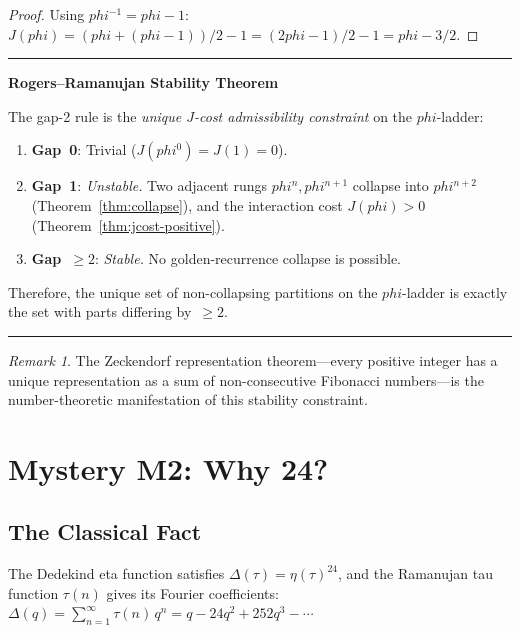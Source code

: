 \documentclass[11pt]{article}
\def\leanverified{}
\def\phig{phi}
\def\Jcost{J}
\theoremstyle{plain}
\theoremstyle{definition}
\theoremstyle{remark}
\newtheorem{remark}[theorem]{Remark}
\newenvironment{keyresult}[1][]
  {\begin{center}\begin{minipage}{0.92\textwidth}\hrule\vspace{0.5em}\textbf{#1}\par\vspace{0.3em}}
  {\vspace{0.5em}\hrule\end{minipage}\end{center}\vspace{0.5em}}
\newcommand{\leanverified}{\textsuperscript{\textnormal{[\textsc{Lean}]}}}
\newcommand{\phig}{\varphi}
\newcommand{\Jcost}{J}
\begin{document}
\begin{proof}
Using $\phig^{-1} = \phig - 1$:
$\Jcost(\phig) = (\phig + (\phig - 1))/2 - 1 = (2\phig - 1)/2 - 1 = \phig - 3/2$.
\end{proof}

\begin{keyresult}[Rogers--Ramanujan Stability Theorem\leanverified]
The gap-2 rule is the \emph{unique $\Jcost$-cost admissibility constraint} on the $\phig$-ladder:
\begin{enumerate}[label=(\roman*)]
\item \textbf{Gap~0}: Trivial ($\Jcost(\phig^0) = \Jcost(1) = 0$).
\item \textbf{Gap~1}: \emph{Unstable.}
      Two adjacent rungs $\phig^n, \phig^{n+1}$ collapse
      into $\phig^{n+2}$ (Theorem~\ref{thm:collapse}),
      and the interaction cost $\Jcost(\phig) > 0$ (Theorem~\ref{thm:jcost-positive}).
\item \textbf{Gap~$\ge 2$}: \emph{Stable.}
      No golden-recurrence collapse is possible.
\end{enumerate}
Therefore, the unique set of non-collapsing partitions on the $\phig$-ladder
is exactly the set with parts differing by~$\ge 2$.
\end{keyresult}

\begin{remark}
The Zeckendorf representation theorem---every positive integer has a
unique representation as a sum of non-consecutive Fibonacci numbers---is
the number-theoretic manifestation of this stability constraint.
\end{remark}

\section[Mystery M2: Why 24?]{Mystery M2: Why 24?}
\label{sec:24}

\subsection{The Classical Fact}

The Dedekind eta function satisfies $\Delta(\tau) = \eta(\tau)^{24}$,
and the Ramanujan tau function $\tau(n)$ gives its Fourier coefficients:
$\Delta(q) = \sum_{n=1}^{\infty} \tau(n)\, q^n = q - 24q^2 + 252q^3 - \cdots$
\end{document}
